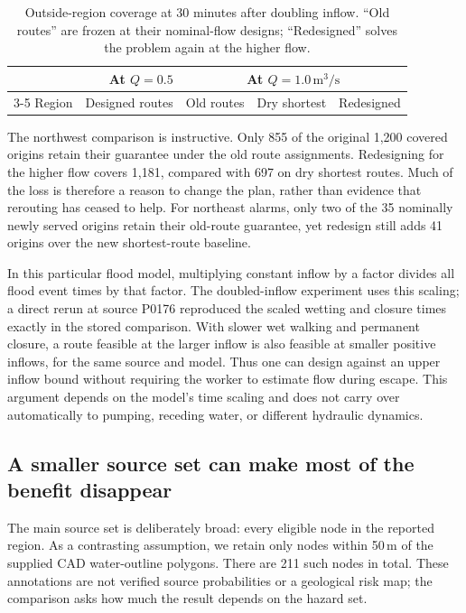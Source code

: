 \documentclass[11pt,a4paper]{article}
\begin{document}
\begin{table}[htbp]
\centering\small
\caption{Outside-region coverage at 30 minutes after doubling inflow. ``Old routes'' are frozen at their nominal-flow designs; ``Redesigned'' solves the problem again at the higher flow.}\label{tab:flow}
\begin{tabular}{@{}lrrrr@{}}\toprule
& At $Q=0.5$ & \multicolumn{3}{c}{At $Q=1.0\,\mathrm{m^3/s}$}\\
\cmidrule(lr){3-5}
Region & Designed routes & Old routes & Dry shortest & Redesigned\\\midrule

\end{tabular}
\end{table}

The northwest comparison is instructive. Only 855 of the original 1,200 covered origins retain their guarantee under the old route assignments. Redesigning for the higher flow covers 1,181, compared with 697 on dry shortest routes. Much of the loss is therefore a reason to change the plan, rather than evidence that rerouting has ceased to help. For northeast alarms, only two of the 35 nominally newly served origins retain their old-route guarantee, yet redesign still adds 41 origins over the new shortest-route baseline.

In this particular flood model, multiplying constant inflow by a factor divides all flood event times by that factor. The doubled-inflow experiment uses this scaling; a direct rerun at source P0176 reproduced the scaled wetting and closure times exactly in the stored comparison. With slower wet walking and permanent closure, a route feasible at the larger inflow is also feasible at smaller positive inflows, for the same source and model. Thus one can design against an upper inflow bound without requiring the worker to estimate flow during escape. This argument depends on the model's time scaling and does not carry over automatically to pumping, receding water, or different hydraulic dynamics.

\subsection{A smaller source set can make most of the benefit disappear}
The main source set is deliberately broad: every eligible node in the reported region. As a contrasting assumption, we retain only nodes within 50\,m of the supplied CAD water-outline polygons. There are 211 such nodes in total. These annotations are not verified source probabilities or a geological risk map; the comparison asks how much the result depends on the hazard set.
\end{document}
